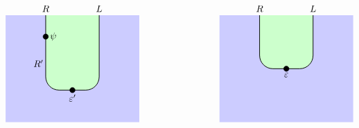 {\[\begin{tikzpicture}
\begin{scope}[shift={(8,0)}]
           \end{scope}
           
           \begin{scope}[shift={(16,0)}]
               \begin{scope} 
                   \clip (-2.5,0) rectangle (2.5, 4);     
                   \fill[fill=midcolor] (-3,0) rectangle (3, 4);  
                    
                   \draw[fill=leftcolor, rounded corners=0.5cm, line width=0.7pt] (-1, 6) rectangle (1, 1.2);
               \end{scope}
             
               \filldraw [black] (-1,3.2) circle (0.1) node[right=1pt] {$\psi$};
               \node[above] at (-1, 4) {$R$};
               \node[left=-1pt] at (-1, 2.2) {$R'$};
               \node[above] at (1, 4) {$L$};
               \draw[fill=black] (0, 1.2) circle (0.1);
               \node[below=1pt] at (0, 1.2) {$\varepsilon'$}; 
             
           \end{scope}
           
           \begin{scope}[shift={(24,0)}]
               \begin{scope} 
                   \clip (-2.5,0) rectangle (2.5, 4); 
                   \fill[fill=midcolor] (-3,0) rectangle (3, 4);  
                   \draw[fill=leftcolor, rounded corners=0.5cm, line width=0.7pt] (-1, 6) rectangle (1, 2);
               \end{scope}
               \node[above] at (1, 4) {$L$};
               \node[above] at (-1, 4) {$R$};
               \draw[fill=black] (0, 2) circle (0.1);
               \node[below=1pt] at (0, 2) {$\varepsilon$}; 
           
           \end{scope}
           
        \end{tikzpicture}
    \]
}
